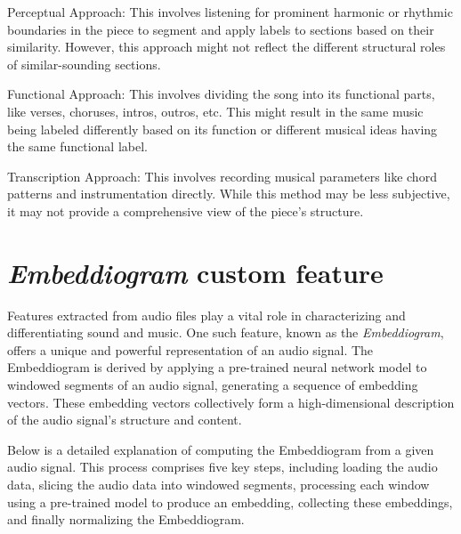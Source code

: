Perceptual Approach: This involves listening for prominent harmonic or rhythmic boundaries in the piece to segment and apply labels to sections based on their similarity. However, this approach might not reflect the different structural roles of similar-sounding sections.

Functional Approach: This involves dividing the song into its functional parts, like verses, choruses, intros, outros, etc. This might result in the same music being labeled differently based on its function or different musical ideas having the same functional label.

Transcription Approach: This involves recording musical parameters like chord patterns and instrumentation directly. While this method may be less subjective, it may not provide a comprehensive view of the piece's structure.

\section{\textit{Embeddiogram} custom feature}

Features extracted from audio files play a vital role in characterizing and differentiating sound and music. One such feature, known as the \textit{Embeddiogram}, offers a unique and powerful representation of an audio signal. The Embeddiogram is derived by applying a pre-trained neural network model to windowed segments of an audio signal, generating a sequence of embedding vectors. These embedding vectors collectively form a high-dimensional description of the audio signal's structure and content.

Below is a detailed explanation of computing the Embeddiogram from a given audio signal. This process comprises five key steps, including loading the audio data, slicing the audio data into windowed segments, processing each window using a pre-trained model to produce an embedding, collecting these embeddings, and finally normalizing the Embeddiogram. 

